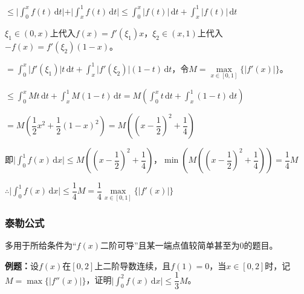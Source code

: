 \documentclass[UTF8, 12pt]{ctexart}
\begin{document}
$\leqslant\vert\int_0^xf(t)\,\textrm{d}t\vert+\vert\int_x^1f(t)\,\textrm{d}t\vert\leqslant\int_0^x\vert f(t)\vert\,\textrm{d}t+\int_x^1\vert f(t)\vert\,\textrm{d}t$

$\xi_1\in(0,x)$上代入$f(x)=f'(\xi_1)x$，$\xi_2\in(x,1)$上代入$-f(x)=f'(\xi_2)(1-x)$。

$=\int_0^x\vert f'(\xi_1)\vert t\,\textrm{d}t+\int_x^1\vert f'(\xi_2)\vert(1-t)\,\textrm{d}t$，令$M=\max\limits_{x\in[0,1]}\{\vert f'(x)\vert\}$。

$\leqslant\int_0^xMt\,\textrm{d}t+\int_x^1M(1-t)\,\textrm{d}t=M\left(\int_0^xt\,\textrm{d}t+\int_x^1(1-t)\,\textrm{d}t\right)$

$=M\left(\dfrac{1}{2}x^2+\dfrac{1}{2}(1-x)^2\right)=M\left(\left(x-\dfrac{1}{2}\right)^2+\dfrac{1}{4}\right)$

即$\vert\int_0^1f(x)\,\textrm{d}x\vert\leqslant M\left(\left(x-\dfrac{1}{2}\right)^2+\dfrac{1}{4}\right)$，$\min\left(M\left(\left(x-\dfrac{1}{2}\right)^2+\dfrac{1}{4}\right)\right)=\dfrac{1}{4}M$

$\therefore\vert\int_0^1f(x)\,\textrm{d}x\vert\leqslant\dfrac{1}{4}M=\dfrac{1}{4}\max\limits_{x\in[0,1]}\{\vert f'(x)\vert\}$

\subsubsection{泰勒公式}

多用于所给条件为“$f(x)$二阶可导”且某一端点值较简单甚至为0的题目。

\textbf{例题：}设$f(x)$在$[0,2]$上二阶导数连续，且$f(1)=0$，当$x\in[0,2]$时，记$M=\max\{\vert f''(x)\vert\}$，证明$\vert\int_0^2f(x)\,\textrm{d}x\vert\leqslant\dfrac{1}{3}M$。
\end{document}
